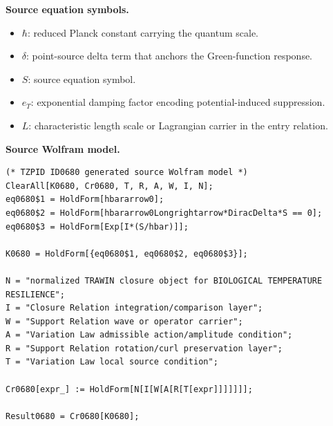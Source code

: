 \begin{minipage}[t]{0.49\linewidth}
\begingroup
\small
\raggedright
\textbf{Source equation symbols.}\par
\begin{itemize}[leftmargin=1.35em,itemsep=1pt,topsep=1pt,parsep=0pt]
    \item $\hbar$: reduced Planck constant carrying the quantum scale.
    \item $\delta$: point-source delta term that anchors the Green-function response.
    \item $S$: source equation symbol.
    \item $e_T$: exponential damping factor encoding potential-induced suppression.
    \item $L$: characteristic length scale or Lagrangian carrier in the entry relation.
\end{itemize}
\endgroup
\end{minipage}\hfill
\begin{minipage}[t]{0.47\linewidth}
\begingroup
\scriptsize
\raggedright
\textbf{Source Wolfram model.}\par
\begin{Verbatim}[fontsize=\tiny,breaklines=true,breakanywhere=true]
(* TZPID ID0680 generated source Wolfram model *)
ClearAll[K0680, Cr0680, T, R, A, W, I, N];
eq0680$1 = HoldForm[hbararrow0];
eq0680$2 = HoldForm[hbararrow0Longrightarrow*DiracDelta*S == 0];
eq0680$3 = HoldForm[Exp[I*(S/hbar)]];

K0680 = HoldForm[{eq0680$1, eq0680$2, eq0680$3}];

N = "normalized TRAWIN closure object for BIOLOGICAL TEMPERATURE RESILIENCE";
I = "Closure Relation integration/comparison layer";
W = "Support Relation wave or operator carrier";
A = "Variation Law admissible action/amplitude condition";
R = "Support Relation rotation/curl preservation layer";
T = "Variation Law local source condition";

Cr0680[expr_] := HoldForm[N[I[W[A[R[T[expr]]]]]]];

Result0680 = Cr0680[K0680];
\end{Verbatim}
\endgroup
\end{minipage}

